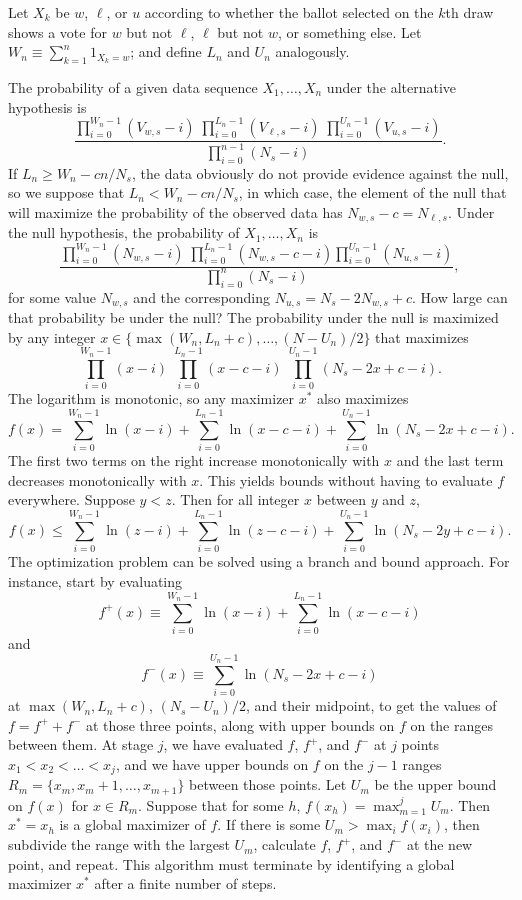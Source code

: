 \documentclass[runningheads]{llncs}
\begin{document}
Let $X_k$ be $w$, $\ell$, or $u$ according to whether the ballot selected on the $k$th draw 
shows a vote for $w$ but not $\ell$, $\ell$ but not $w$, or something else.
Let $W_n \equiv \sum_{k=1}^n 1_{X_k = w}$; and define $L_n$ and $U_n$ analogously.

The probability of a given data sequence $X_1, \ldots, X_n$ under the alternative hypothesis is
$$
    \frac{\prod_{i=0}^{W_n-1} (V_{w,s}-i) \; 
             \prod_{i=0}^{L_n-1} (V_{\ell,s}-i) \;
             \prod_{i=0}^{U_n-1} (V_{u,s}-i)}
            {\prod_{i=0}^{n-1} (N_s-i)}.
$$
If $L_n \ge W_n - cn/N_s$, the data obviously do not provide evidence against the null, so we suppose that
$L_n < W_n - cn/N_s$, in which case, the element of the null that will maximize the probability of the observed data has $N_{w,s} - c = N_{\ell,s}$.
Under the null hypothesis, the probability of $X_1, \ldots, X_n$ is
$$
    \frac{ \prod_{i=0}^{W_n-1} (N_{w,s}-i) \;
             \prod_{i=0}^{L_n-1}(N_{w,s}-c - i)
             \prod_{i=0}^{U_n-1} (N_{u,s}-i)}
             {\prod_{i=0}^n (N_s-i)},
$$
for some value $N_{w,s}$ and the corresponding $N_{u,s} = N_s - 2N_{w,s}+c$.
How large can that probability be under the null? 
The probability under the null is maximized by any integer 
$x \in \{ \max(W_n, L_n+c), \ldots, (N-U_n)/2 \}$ that maximizes 
$$
\prod_{i=0}^{W_n-1} (x-i) \; \prod_{i=0}^{L_n-1} (x-c-i) \; \prod_{i=0}^{U_n-1} (N_s-2x+c - i).
$$
The logarithm is monotonic, so any maximizer $x^*$ also maximizes
$$ f(x) = \sum_{i=0}^{W_n-1} \ln (x-i) + \sum_{i=0}^{L_n-1} \ln (x-c-i) + \sum_{i=0}^{U_n-1} \ln (N_s-2x+ c - i).$$
The first two terms on the right increase monotonically with $x$ and the last term decreases monotonically with $x$.
This yields bounds without having to evaluate $f$ everywhere.
Suppose $y < z$. 
Then for all integer $x$ between $y$ and $z$, 
$$ f(x) \le \sum_{i=0}^{W_n-1} \ln (z-i) + \sum_{i=0}^{L_n-1} \ln (z-c-i) + \sum_{i=0}^{U_n-1} \ln (N_s-2y+c-i).$$
The optimization problem can be solved using a branch and bound approach.
For instance, start by evaluating 
$$
   f^+(x) \equiv \sum_{i=0}^{W_n-1} \ln (x-i) + \sum_{i=0}^{L_n-1} \ln (x-c-i)
$$
and
$$
  f^-(x) \equiv \sum_{i=0}^{U_n-1} \ln (N_s-2x+c-i)
$$
at $\max(W_n, L_n+c)$, $(N_s-U_n)/2$, and their midpoint,
 to get the values of $f = f^+ + f^-$ at those three points, along with 
upper bounds on $f$ on the ranges between them.
At stage $j$, we have evaluated $f$, $f^+$, and $f^-$ at $j$ points $x_1 < x_2 < \ldots < x_j$, and 
we have upper bounds on $f$ on the $j-1$ ranges $R_m = \{x_m, x_m+1, \ldots, x_{m+1}\}$
between those points.
Let $U_m$ be the upper bound on $f(x)$ for $x \in R_m$.
Suppose that for some $h$, $f(x_h) = \max_{m=1}^j U_m$.
Then $x^* = x_h$ is a global maximizer of $f$.
If there is some $U_m > \max_i f(x_i)$, then subdivide the range with the largest $U_m$,
calculate $f$, $f^+$, and $f^-$ at the new point, and repeat.
This algorithm must terminate by identifying a global maximizer $x^*$ after a finite number of steps.
\end{document}
